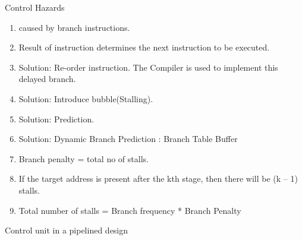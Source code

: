 \begin{enumerate}
\begin{minipage}{\linewidth}
    \item Control Hazards
    \begin{enumerate}
        \item caused by branch instructions.
        \item Result of instruction determines the next instruction to be executed.
        \item Solution: Re-order instruction. The Compiler is used to implement this delayed branch.
        \item Solution: Introduce bubble(Stalling).
        \item Solution: Prediction.
        \item Solution: Dynamic Branch Prediction : Branch Table Buffer
        \item Branch penalty = total no of stalls.
        \item If the target address is present after the kth stage, then there will be (k – 1) stalls.
        \item Total number of stalls = Branch frequency * Branch Penalty
    \end{enumerate}
    \end{minipage}

    \item  Control unit in a pipelined design

\end{enumerate}
